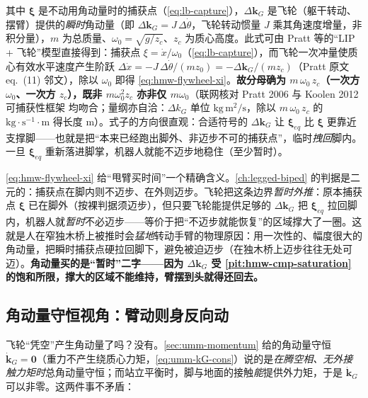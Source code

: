 其中 $\boldsymbol\xi$ 是不动用角动量时的捕获点（\cref{eq:lb-capture}），$\Delta\mathbf k_G$ 是飞轮（躯干转动、摆臂）提供的\emph{瞬时}角动量（即 $\Delta\mathbf k_G=J\,\Delta\dot\theta$，飞轮转动惯量 $J$ 乘其角速度增量，非积分量），$m$ 为总质量、$\omega_0=\sqrt{g/z_c}$、$z_c$ 为质心高度。此式可由 Pratt 等的“LIP + 飞轮”模型直接得到\cite{pratt2006capture}：捕获点 $\xi=\dot x/\omega_0$（\cref{eq:lb-capture}），而飞轮一次冲量使质心有效水平速度产生阶跃 $\Delta\dot x=-J\,\Delta\dot\theta/(m z_0)=-\Delta\mathbf k_G/(m z_c)$（Pratt 原文 eq.~(11) 邻文），除以 $\omega_0$ 即得 \cref{eq:hmw-flywheel-xi}。\textbf{故分母确为 $m\,\omega_0\,z_c$（一次方 $\omega_0$、一次方 $z_c$），既非 $m\omega_0^2 z_c$ 亦非仅 $m\omega_0$}（联网核对 Pratt 2006 与 Koolen 2012 可捕获性框架\cite{koolen2012capturability} 均吻合；量纲亦自洽：$\Delta k_G$ 单位 $\mathrm{kg\,m^2/s}$，除以 $m\,\omega_0\,z_c$ 的 $\mathrm{kg\cdot s^{-1}\cdot m}$ 得长度 $\mathrm m$）。式子的方向很直观：合适符号的 $\Delta\mathbf k_G$ 让 $\boldsymbol\xi_{eq}$ 比 $\boldsymbol\xi$ 更靠近支撑脚——也就是把“本来已经跑出脚外、非迈步不可的捕获点”，临时\emph{拽回}脚内。一旦 $\boldsymbol\xi_{eq}$ 重新落进脚掌，机器人就能不迈步地稳住（至少暂时）。

\begin{insight}[等效捕获点 = 把“0 步可捕获区”暂时撑大]\label{ins:hmw-flywheel-region}
\cref{eq:hmw-flywheel-xi} 给“甩臂买时间”一个精确含义。\cref{ch:legged-biped} 的判据是二元的：捕获点在脚内则不迈步、在外则迈步。飞轮把这条边界\emph{暂时外推}：原本捕获点 $\boldsymbol\xi$ 已在脚外（按裸判据须迈步），但只要飞轮能提供足够的 $\Delta\mathbf k_G$ 把 $\boldsymbol\xi_{eq}$ 拉回脚内，机器人就\emph{暂时}不必迈步——等价于把“不迈步就能恢复”的区域撑大了一圈。这就是人在窄独木桥上被推时会\emph{猛地}转动手臂的物理原因：用一次性的、幅度很大的角动量，把瞬时捕获点硬拉回脚下，避免被迫迈步（在独木桥上迈步往往无处可迈）。\textbf{角动量买的是“暂时”二字——因为 $\Delta\mathbf k_G$ 受 \cref{pit:hmw-cmp-saturation} 的饱和所限，撑大的区域不能维持，臂摆到头就得还回去。}
\end{insight}

\subsection{角动量守恒视角：臂动则身反向动}
\label{subsec:hmw-conservation}

飞轮“凭空”产生角动量了吗？没有。\cref{sec:umm-momentum} 给的角动量守恒 $\dot{\mathbf k}_G=\mathbf 0$（重力不产生绕质心力矩，\cref{eq:umm-kG-cons}）说的是\emph{在腾空相、无外接触力矩时}总角动量守恒；而站立平衡时，脚与地面的接触\emph{能}提供外力矩，于是 $\dot{\mathbf k}_G$ 可以非零。这两件事不矛盾：

